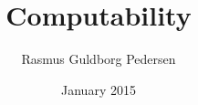 \documentclass{beamer}
\title[Computability]{Computability}
\author{Rasmus Guldborg Pedersen}
\date{January 2015} %
\begin{document}
\begin{frame}
\titlepage
\end{frame}

\end{document}
